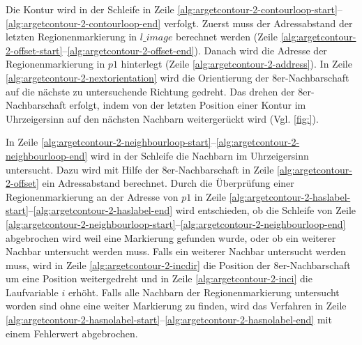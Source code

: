 Die Kontur wird in der Schleife in Zeile
 \ref{alg:argetcontour-2-contourloop-start}--\ref{alg:argetcontour-2-contourloop-end} verfolgt. Zuerst muss der
 Adressabstand der letzten Regionenmarkierung in $\mathit{l\_image}$ berechnet werden (Zeile
 \ref{alg:argetcontour-2-offset-start}--\ref{alg:argetcontour-2-offset-end}). Danach wird die Adresse der
 Regionenmarkierung in $\mathit{p1}$ hinterlegt (Zeile \ref{alg:argetcontour-2-address}). In Zeile
 \ref{alg:argetcontour-2-nextorientation} wird die Orientierung der 8er-Nachbarschaft auf die nächste zu untersuchende
 Richtung gedreht. Das drehen der 8er-Nachbarschaft erfolgt, indem von der letzten Position einer Kontur im
 Uhrzeigersinn auf den nächsten Nachbarn weitergerückt wird (Vgl. \autoref{fig:}).

In Zeile \ref{alg:argetcontour-2-neighbourloop-start}--\ref{alg:argetcontour-2-neighbourloop-end} wird in der Schleife
 die Nachbarn im Uhrzeigersinn untersucht. Dazu wird mit Hilfe der 8er-Nachbarschaft in Zeile
 \ref{alg:argetcontour-2-offset} ein Adressabstand berechnet. Durch die Überprüfung einer Regionenmarkierung an der
 Adresse von $\mathit{p1}$ in Zeile \ref{alg:argetcontour-2-haslabel-start}--\ref{alg:argetcontour-2-haslabel-end} wird
 entschieden, ob die Schleife von Zeile
 \ref{alg:argetcontour-2-neighbourloop-start}--\ref{alg:argetcontour-2-neighbourloop-end} abgebrochen wird weil eine
 Markierung gefunden wurde, oder ob ein weiterer Nachbar untersucht werden muss. Falls ein weiterer Nachbar untersucht
 werden muss, wird in Zeile \ref{alg:argetcontour-2-incdir} die Position der 8er-Nachbarschaft um eine Position
 weitergedreht und in Zeile \ref{alg:argetcontour-2-inci} die Laufvariable $i$ erhöht. Falls alle Nachbarn der
 Regionenmarkierung untersucht worden sind ohne eine weiter Markierung zu finden, wird das Verfahren in Zeile
 \ref{alg:argetcontour-2-hasnolabel-start}--\ref{alg:argetcontour-2-hasnolabel-end} mit einem Fehlerwert abgebrochen.

